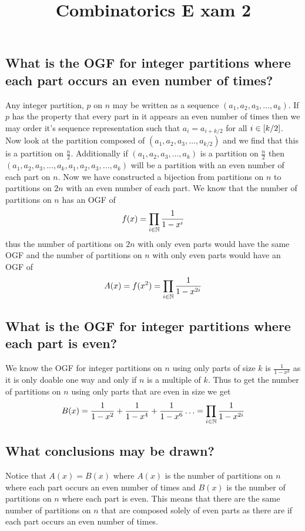 \documentclass{article}
\title{Combinatorics E
	xam 2}
\theoremstyle{definition}
\begin{document}
	\maketitle
	\section{}
	\subsection{What is the OGF for integer partitions where each part occurs an even number of times?}
	Any integer partition, $p$ on $n$ may be written as a sequence $(a_1, a_2, a_3, \ldots, a_k)$. If $p$ has the property that every part in it appears an even number of times then we may order it's sequence representation such that $a_i = a_{i+k/2}$ for all $i\in\left[ k/2 \right]$. Now look at the partition composed of $(a_1, a_2, a_3, \ldots, a_{k/2})$ and we find that this is a partition on $\frac n2$. Additionally if $(a_1, a_2, a_3, \ldots, a_k)$ is a partition on $\frac n2$ then $(a_1, a_2, a_3, \ldots, a_k, a_1, a_2, a_3, \ldots, a_k)$ will be a partition with an even number of each part on $n$. Now we have constructed a bijection from partitions on $n$ to partitions on $2n$ with an even number of each part. We know that the number of partitions on $n$ has an OGF of $$f(x) = \prod\limits_{i\in\mathbb N}^{} {\frac1{1-x^i}} $$ thus the number of partitions on $2n$ with only even parts would have the same OGF and the number of partitions on $n$ with only even parts would have an OGF of $$A(x) = f(x^2) = \prod\limits_{i\in\mathbb N}^{} {\frac{1}{1-x^{2i}}} $$
	
	\subsection{What is the OGF for integer partitions where each part is even?}
	We know the OGF for integer partitions on $n$ using only parts of size $k$ is $\frac1{1-x^k}$ as it is only doable one way and only if $n$ is a multiple of $k$. Thus to get the number of partitions on $n$ using only parts that are even in size we get $$B(x) = \frac1{1-x^2} + \frac1{1-x^4} + \frac1{1-x^6} \ldots = \prod\limits_{i \in\mathbb N}^{} {\frac1{1-x^{2i}}} $$
	
	\subsection{What conclusions may be drawn?}
	Notice that $A(x) = B(x)$ where $A(x)$ is the number of partitions on $n$ where each part occurs an even number of times and $B(x)$ is the number of partitions on $n$ where each part is even. This means that there are the same number of partitions on $n$ that are composed solely of even parts as there are if each part occurs an even number of times.
	
\end{document}
